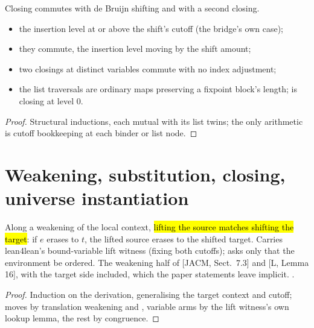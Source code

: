 \begin{lemma}
\label{lem:toBvar_shift}
\leanok
{}
 Closing commutes with de Bruijn shifting and with a second closing.
\begin{itemize}
\item {} the insertion level at or above the shift's cutoff (the bridge's own case);
\item {} they commute, the insertion level moving by the shift amount;
\item two closings at distinct variables commute with no index adjustment;
\item the list traversals are ordinary maps preserving a fixpoint block's length;  is closing at level $0$.
\end{itemize}
\end{lemma}
\begin{proof}
\leanok
{}
 Structural inductions, each mutual with its list twins; the only arithmetic is cutoff bookkeeping at each binder or list node.
\end{proof}

\section{Weakening, substitution, closing, universe instantiation}
\label{sec:erases:transport}

\begin{theorem}
\label{thm:erases_shift}
\leanok
{}
 Along a weakening of the local context, \hl{lifting the source matches shifting the target}: if $e$ erases to $t$, the lifted source erases to the shifted target.
 Carries lean4lean's bound-variable lift witness (fixing both cutoffs); asks only that the environment be ordered. The weakening half of [JACM, Sect.\ 7.3] and [L, Lemma 16], with the target side included, which the paper statements leave implicit.
 \stProved{}.
\end{theorem}
\begin{proof}
\leanok
{}
 Induction on the derivation, generalising the target context and cutoff;  moves by translation weakening and , variable arms by the lift witness's own lookup lemma, the rest by congruence.
\end{proof}


